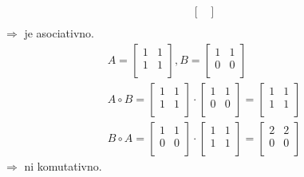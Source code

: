 \begin{enumerate}[label=\alph*)]
\begin{align*}
\begin{bmatrix}
        \end{bmatrix} \\
    \end{align*}
    $\Rightarrow$ je asociativno.
    \begin{align*}
        A = 
        \begin{bmatrix}
            1 & 1 \\
            1 & 1 \\
        \end{bmatrix}, 
        B = 
        \begin{bmatrix}
            1 & 1 \\
            0 & 0 \\
        \end{bmatrix} \\[1em]
        A \circ B = 
        \begin{bmatrix}
            1 & 1 \\
            1 & 1 \\
        \end{bmatrix} \cdot 
        \begin{bmatrix}
            1 & 1 \\
            0 & 0 \\
        \end{bmatrix}
        = 
        \begin{bmatrix}
            1 & 1 \\
            1 & 1 \\
        \end{bmatrix} \\[1em]
        B \circ A = 
        \begin{bmatrix}
            1 & 1 \\
            0 & 0 \\
        \end{bmatrix} \cdot 
        \begin{bmatrix}
            1 & 1 \\
            1 & 1 \\
        \end{bmatrix} =
        \begin{bmatrix}
            2 & 2 \\
            0 & 0 \\
        \end{bmatrix}
    \end{align*}
    $\Rightarrow$ ni komutativno.
\end{enumerate}

